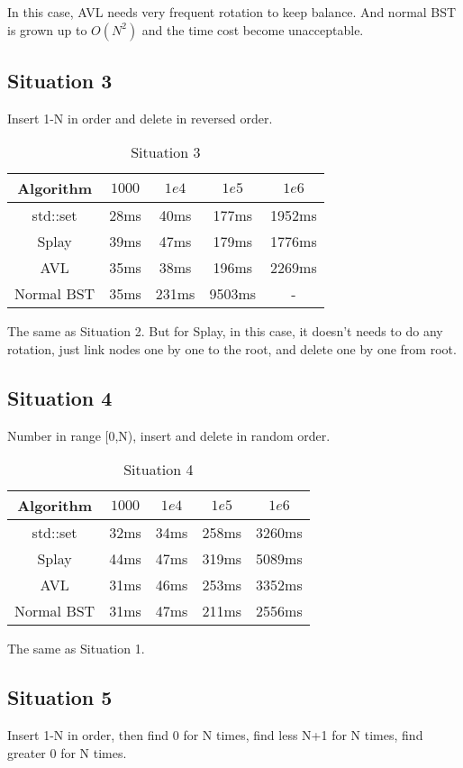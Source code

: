 \documentclass[UTF8]{report}
\numberwithin{figure}{subsection}
\numberwithin{table}{subsection}
\begin{document}
In this case, AVL needs very frequent rotation to keep balance. And normal BST is grown up to $O(N^2)$ and 
the time cost become unacceptable.

\subsection{Situation 3}
Insert 1-N in order and delete in reversed order.

\begin{table}[h!t]
  \centering
  \begin{tabular}{ccccc}
    \toprule
    Algorithm & $1000$ & $1e4$ & $1e5$ & $1e6$\\
    \midrule
    std::set  &28ms&40ms&177ms&1952ms\\
    Splay     &39ms&47ms&179ms&1776ms\\
    AVL       &35ms&38ms&196ms&2269ms\\
    Normal BST&35ms&231ms&9503ms&-\\
    \bottomrule
  \end{tabular}
  \caption{Situation 3}
\end{table}

The same as Situation 2. But for Splay, in this case, it doesn't needs to do any rotation, just 
link nodes one by one to the root, and delete one by one from root.

\subsection{Situation 4}
Number in range [0,N), insert and delete in random order.

\begin{table}[h!t]
  \centering
  \begin{tabular}{ccccc}
    \toprule
    Algorithm & $1000$ & $1e4$ & $1e5$ & $1e6$\\
    \midrule
    std::set  &32ms&34ms&258ms&3260ms\\
    Splay     &44ms&47ms&319ms&5089ms\\
    AVL       &31ms&46ms&253ms&3352ms\\
    Normal BST&31ms&47ms&211ms&2556ms\\
    \bottomrule
  \end{tabular}
  \caption{Situation 4}
\end{table}

The same as Situation 1.

\subsection{Situation 5}
Insert 1-N in order, then find 0 for N times, find less N+1 for N times, find greater 0 for N times.
\end{document}
